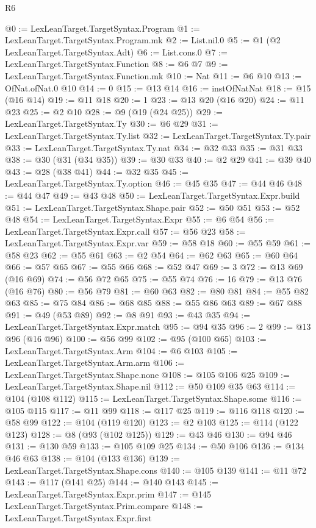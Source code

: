 \begin{lexlean}{R6}
\begin{coremodule}
{{{{{{{{{{{{{{{{{{{{@0 := LexLeanTarget.TargetSyntax.Program
@1 := LexLeanTarget.TargetSyntax.Program.mk
@2 := List.nil.{0}
@5 := @1 (@2 LexLeanTarget.TargetSyntax.Adt)
@6 := List.cons.{0}
@7 := LexLeanTarget.TargetSyntax.Function
@8 := @6 @7
@9 := LexLeanTarget.TargetSyntax.Function.mk
@10 := Nat
@11 := @6 @10
@13 := OfNat.ofNat.{0} @10
@14 := 0
@15 := @13 @14
@16 := instOfNatNat
@18 := @15 (@16 @14)
@19 := @11 @18
@20 := 1
@23 := @13 @20 (@16 @20)
@24 := @11 @23
@25 := @2 @10
@28 := @9 (@19 (@24 @25))
@29 := LexLeanTarget.TargetSyntax.Ty
@30 := @6 @29
@31 := LexLeanTarget.TargetSyntax.Ty.list
@32 := LexLeanTarget.TargetSyntax.Ty.pair
@33 := LexLeanTarget.TargetSyntax.Ty.nat
@34 := @32 @33
@35 := @31 @33
@38 := @30 (@31 (@34 @35))
@39 := @30 @33
@40 := @2 @29
@41 := @39 @40
@43 := @28 (@38 @41)
@44 := @32 @35
@45 := LexLeanTarget.TargetSyntax.Ty.option
@46 := @45 @35
@47 := @44 @46
@48 := @44 @47
@49 := @43 @48
@50 := LexLeanTarget.TargetSyntax.Expr.build
@51 := LexLeanTarget.TargetSyntax.Shape.pair
@52 := @50 @51
@53 := @52 @48
@54 := LexLeanTarget.TargetSyntax.Expr
@55 := @6 @54
@56 := LexLeanTarget.TargetSyntax.Expr.call
@57 := @56 @23
@58 := LexLeanTarget.TargetSyntax.Expr.var
@59 := @58 @18
@60 := @55 @59
@61 := @58 @23
@62 := @55 @61
@63 := @2 @54
@64 := @62 @63
@65 := @60 @64
@66 := @57 @65
@67 := @55 @66
@68 := @52 @47
@69 := 3
@72 := @13 @69 (@16 @69)
@74 := @56 @72 @65
@75 := @55 @74
@76 := 16
@79 := @13 @76 (@16 @76)
@80 := @56 @79
@81 := @60 @63
@82 := @80 @81
@84 := @55 @82 @63
@85 := @75 @84
@86 := @68 @85
@88 := @55 @86 @63
@89 := @67 @88
@91 := @49 (@53 @89)
@92 := @8 @91
@93 := @43 @35
@94 := LexLeanTarget.TargetSyntax.Expr.match
@95 := @94 @35
@96 := 2
@99 := @13 @96 (@16 @96)
@100 := @56 @99
@102 := @95 (@100 @65)
@103 := LexLeanTarget.TargetSyntax.Arm
@104 := @6 @103
@105 := LexLeanTarget.TargetSyntax.Arm.arm
@106 := LexLeanTarget.TargetSyntax.Shape.none
@108 := @105 @106 @25
@109 := LexLeanTarget.TargetSyntax.Shape.nil
@112 := @50 @109 @35 @63
@114 := @104 (@108 @112)
@115 := LexLeanTarget.TargetSyntax.Shape.some
@116 := @105 @115
@117 := @11 @99
@118 := @117 @25
@119 := @116 @118
@120 := @58 @99
@122 := @104 (@119 @120)
@123 := @2 @103
@125 := @114 (@122 @123)
@128 := @8 (@93 (@102 @125))
@129 := @43 @46
@130 := @94 @46
@131 := @130 @59
@133 := @105 @109 @25
@134 := @50 @106
@136 := @134 @46 @63
@138 := @104 (@133 @136)
@139 := LexLeanTarget.TargetSyntax.Shape.cons
@140 := @105 @139
@141 := @11 @72
@143 := @117 (@141 @25)
@144 := @140 @143
@145 := LexLeanTarget.TargetSyntax.Expr.prim
@147 := @145 LexLeanTarget.TargetSyntax.Prim.compare
@148 := LexLeanTarget.TargetSyntax.Expr.first
}}}}}}}}}}}}}}}}}}}}
\end{coremodule}
\end{lexlean}
